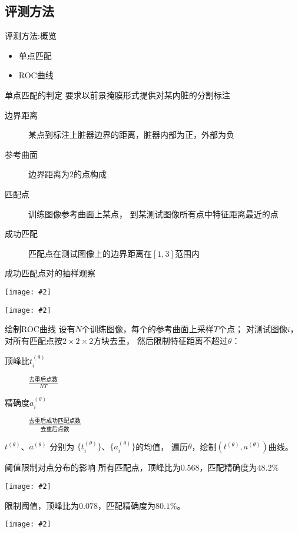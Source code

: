 \documentclass {beamer}
\newcommand{\addgraph}[2]{\begin{center}
\texttt{[image: \#2]}\end{center}}
\begin{document}
\subsection{评测方法}
\begin{frame}{评测方法:概览}
    \begin{itemize}
        \item 单点匹配
        \item ROC曲线
    \end{itemize}
\end{frame}

\begin{frame}{单点匹配的判定}
    要求以前景掩膜形式提供对某内脏的分割标注
    \begin{description}
        \item[边界距离] 某点到标注上脏器边界的距离，脏器内部为正，外部为负
        \item[参考曲面] 边界距离为$2$的点构成
        \item[匹配点] 训练图像参考曲面上某点，
            到某测试图像所有点中特征距离最近的点
        \item[成功匹配] 匹配点在测试图像上的边界距离在$[1, 3]$范围内
    \end{description}
\end{frame}

\begin{frame}{成功匹配点对的抽样观察}
    \addgraph{0.8}{res/expr-match/pt-patch.png}

    \addgraph{0.8}{res/expr-match/pt-bd-dist.png}
\end{frame}

\begin{frame}{绘制ROC曲线}
    设有$N$个训练图像，每个的参考曲面上采样$T$个点；
    对测试图像$i$，对所有匹配点按$2\times 2\times 2$方块去重，
    然后限制特征距离不超过$\theta$：
    \begin{description}
        \item[顶峰比$t_i^{(\theta)}$]
            $\frac{\text{去重后点数}}{NT}$
        \item[精确度$a_i^{(\theta)}$]
            $\frac{\text{去重后成功匹配点数}}{\text{去重后点数}}$
    \end{description}
    $t^{(\theta)}$、$a^{(\theta)}$
    分别为
    $\{t_i^{(\theta)}\}$、$\{a_i^{(\theta)}\}$的均值，
    遍历$\theta$，绘制$(t^{(\theta)}, a^{(\theta)})$曲线。
\end{frame}

\begin{frame}{阈值限制对点分布的影响}
    所有匹配点，顶峰比为$0.568$，匹配精确度为$48.2\%$
    \addgraph{0.7}{res/expr-match/48.2-half.png}

    限制阈值，顶峰比为$0.078$，匹配精确度为$80.1\%$。
    \addgraph{0.7}{res/expr-match/80.1-half.png}
\end{frame}
\end{document}
